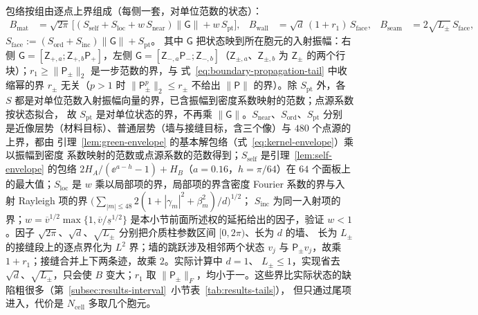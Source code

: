 包络按组由逐点上界组成（每侧一套，对单位范数的状态）：
\begin{align*}
  B_{\mathrm{mat}}&=\sqrt{2\pi}\,\bigl[(S_{\mathrm{self}}+S_{\mathrm{loc}}+w\,S_{\mathrm{near}})\lVert\mathsf G\rVert+w\,S_{\mathrm{pt}}\bigr],
  &B_{\mathrm{wall}}&=\sqrt d\,(1+r_1)\,S_{\mathrm{face}},
  &B_{\mathrm{seam}}&=2\sqrt{L_\pm}\,S_{\mathrm{face}},
\end{align*}
$S_{\mathrm{face}}:=(S_{\mathrm{ord}}+S_{\mathrm{inc}})\lVert\mathsf G\rVert+S_{\mathrm{pt}}$。
其中 $\mathsf G$ 把状态映到所在胞元的入射振幅：右侧
$\mathsf G=[\mathsf Z_{+,a};\mathsf Z_{+,b}\mathsf P_+]$，左侧
$\mathsf G=[\mathsf Z_{-,a}\mathsf P_-;\mathsf Z_{-,b}]$（$\mathsf Z_{\pm,a}$、$\mathsf Z_{\pm,b}$ 为
$\mathsf Z_\pm$ 的两个行块）；$r_1\geq\lVert\mathsf P_\pm\rVert_2$ 是一步范数的界，与
式~\eqref{eq:boundary-propagation-tail} 中收缩幂的界 $r_\pm$ 无关（$p>1$ 时
$\lVert\mathsf P_\pm^p\rVert_2\leq r_\pm$ 不给出 $\lVert\mathsf P\rVert$ 的界）。除 $S_{\mathrm{pt}}$ 外，各 $S$
都是对单位范数入射振幅向量的界，已含振幅到密度系数映射的范数；点源系数按状态拟合，
故 $S_{\mathrm{pt}}$ 是对单位状态的界，不再乘 $\lVert\mathsf G\rVert$。$S_{\mathrm{near}}$、$S_{\mathrm{ord}}$、$S_{\mathrm{pt}}$ 分别
是近像层势（材料目标）、普通层势（墙与接缝目标，含三个像）与 $480$ 个点源的上界，都由
引理~\ref{lem:green-envelope} 的基本解包络（式~\eqref{eq:kernel-envelope}）乘以振幅到密度
系数映射的范数或点源系数的范数得到；$S_{\mathrm{self}}$ 是引理~\ref{lem:self-envelope} 的包络
$2H_A/(\ee^{a-h}-1)+H_B$（$a=0.16$，$h=\pi/64$）在 $64$ 个面板上的最大值；$S_{\mathrm{loc}}$ 是 $w$ 乘以局部项的界，局部项的界含密度
Fourier 系数的界与入射 Rayleigh 项的界
$\bigl(\sum_{|m|\leq48}2(1+|\gamma_m|^2+\beta_m^2)/d\bigr)^{1/2}$；
$S_{\mathrm{inc}}$ 为同一入射项的界；$w=\overline v^{1/2}\max\{1,\overline v/\underline s^{1/2}\}$
是本小节前面所述权的延拓给出的因子，验证 $w<1$。因子 $\sqrt{2\pi}$、$\sqrt d$、$\sqrt{L_\pm}$ 分别把介质柱参数区间 $[0,2\pi)$、长为 $d$ 的墙、
长为 $L_\pm$ 的接缝段上的逐点界化为 $L^2$ 界；墙的跳跃涉及相邻两个状态 $v_j$ 与
$\mathsf P_\pm v_j$，故乘 $1+r_1$；接缝合并上下两条迹，故乘 $2$。实际计算中 $d=1$、
$L_\pm\leq1$，实现省去 $\sqrt d$、$\sqrt{L_\pm}$，只会使 $B$ 变大；$r_1$ 取
$\lVert\mathsf P_\pm\rVert_F$，均小于一。这些界比实际状态的缺陷粗很多（第~\ref{subsec:results-interval}~小节表~\ref{tab:results-tails}），
但只通过尾项进入，代价是 $N_{\mathrm{cell}}$ 多取几个胞元。

